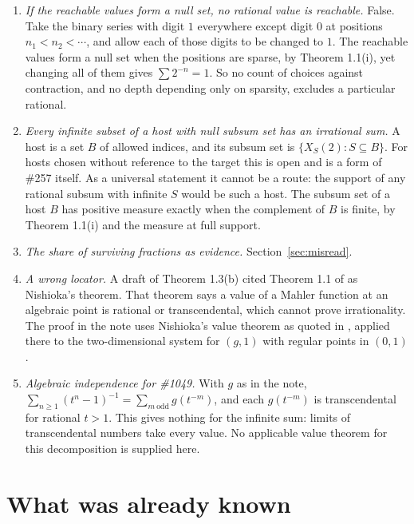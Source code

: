 \documentclass[11pt]{article}
\begin{document}
\begin{enumerate}
\item \emph{If the reachable values form a null set, no rational value is
  reachable.}  False.  Take the binary series with digit $1$ everywhere except
  digit $0$ at positions $n_1<n_2<\cdots$, and allow each of those digits to be
  changed to $1$.  The reachable values form a null set when the positions are
  sparse, by Theorem 1.1(i), yet changing all of them gives $\sum2^{-n}=1$.
  So no count of choices against contraction, and no depth depending only on
  sparsity, excludes a particular rational.
\item \emph{Every infinite subset of a host with null subsum set has an
  irrational sum.}  A host is a set $B$ of allowed indices, and its subsum set
  is $\{X_S(2):S\subseteq B\}$.  For hosts chosen without reference to the target this is
  open and is a form of \#257 itself.  As a universal statement it cannot be a
  route: the support of any rational subsum with infinite $S$ would be such a
  host.  The subsum set of a host $B$ has positive measure exactly when the
  complement of $B$ is finite, by Theorem 1.1(i) and the measure at full
  support.
\item \emph{The share of surviving fractions as evidence.}  Section~\ref{sec:misread}.
\item \emph{A wrong locator.}  A draft of Theorem 1.3(b) cited Theorem 1.1 of
  \cite{adamczewskifaverjon2026} as Nishioka's theorem.  That theorem says a
  value of a Mahler function at an algebraic point is rational or
  transcendental, which cannot prove irrationality.  The proof in the note uses
  Nishioka's value theorem as quoted in
  \cite[Theorem~1.1, p.~3]{adamczewskifaverjon2016}, applied there to the
  two-dimensional system for $(g,1)$ with regular points in $(0,1)$.
\item \emph{Algebraic independence for \#1049.}  With $g$ as in the note,
  $\sum_{n\ge1}(t^n-1)^{-1}=\sum_{m\ \mathrm{odd}}g(t^{-m})$, and each $g(t^{-m})$
  is transcendental for rational $t>1$.  This gives nothing for the infinite
  sum: limits of transcendental numbers take every value.  No applicable
  value theorem for this decomposition is supplied here.
\end{enumerate}

\section{What was already known}\label{sec:known}
\end{document}
